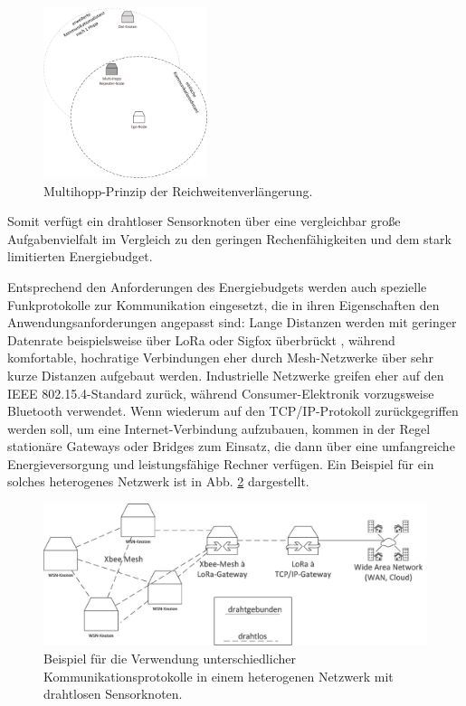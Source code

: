 \begin{figure}[!ht]
\centering
\includegraphics[height=5cm]{your_content_folder/your_figures/fig_intro/Multihopp.png}
\caption{Multihopp-Prinzip der Reichweitenverlängerung.}
\label{fig_multihopp}
\end{figure}

Somit verfügt ein drahtloser Sensorknoten über eine vergleichbar große Aufgabenvielfalt im Vergleich zu den geringen Rechenfähigkeiten und dem stark limitierten Energiebudget.

Entsprechend den Anforderungen des Energiebudgets werden auch spezielle Funkprotokolle zur Kommunikation eingesetzt, die in ihren Eigenschaften den Anwendungsanforderungen angepasst sind: Lange Distanzen werden mit geringer Datenrate beispielsweise über LoRa oder Sigfox überbrückt \parencite{Linklabs2016}, während komfortable, hochratige Verbindungen eher durch Mesh-Netzwerke \parencite{methley_essentials_2009} über sehr kurze Distanzen aufgebaut werden. Industrielle Netzwerke greifen eher auf den IEEE 802.15.4-Standard zurück, während Consumer-Elektronik vorzugsweise Bluetooth verwendet. Wenn wiederum auf den TCP/IP-Protokoll zurückgegriffen werden soll, um eine Internet-Verbindung aufzubauen, kommen in der Regel stationäre Gateways oder Bridges zum Einsatz, die dann über eine umfangreiche Energieversorgung und leistungsfähige Rechner verfügen. Ein Beispiel für ein solches heterogenes Netzwerk ist in Abb. \ref{fig_routed} dargestellt.

\begin{figure}[!ht]
\centering
\includegraphics[width=12cm]{your_content_folder/your_figures/fig_intro/Routed_Network.png}
\caption{Beispiel für die Verwendung unterschiedlicher Kommunikationsprotokolle in einem heterogenen Netzwerk mit drahtlosen Sensorknoten.}
\label{fig_routed}
\end{figure}

